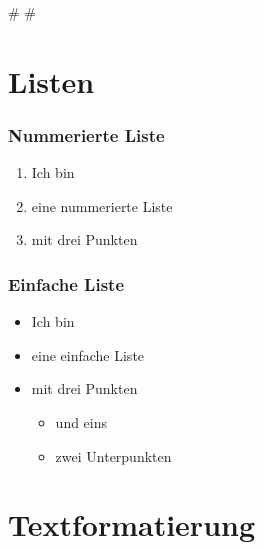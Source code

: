 
\def\mytitle{File Network: Fortschrittsberichte}
\def\myauthor{Anastasia Kazakova, Bengt Lüers}
\def\latexmode{beamer}
\def\latexxslt{beamer}
\def\theme{keynote-IntSysTheme}

\def\bibliocommand{}
\def\bibliostyle{chicago}

\# \#

\section{Listen}
\label{listen}

\begin{frame}

\frametitle{Nummerierte Liste}
\label{nummerierteliste}

\begin{enumerate}
\item Ich bin

\item eine nummerierte Liste

\item mit drei Punkten

\end{enumerate}

\end{frame}

\begin{frame}

\frametitle{Einfache Liste}
\label{einfacheliste}

\begin{itemize}
\item Ich bin

\item eine einfache Liste

\item mit drei Punkten

\begin{itemize}
\item und eins

\item zwei Unterpunkten

\end{itemize}

\end{itemize}

\end{frame}

\section{Textformatierung}
\label{textformatierung}


